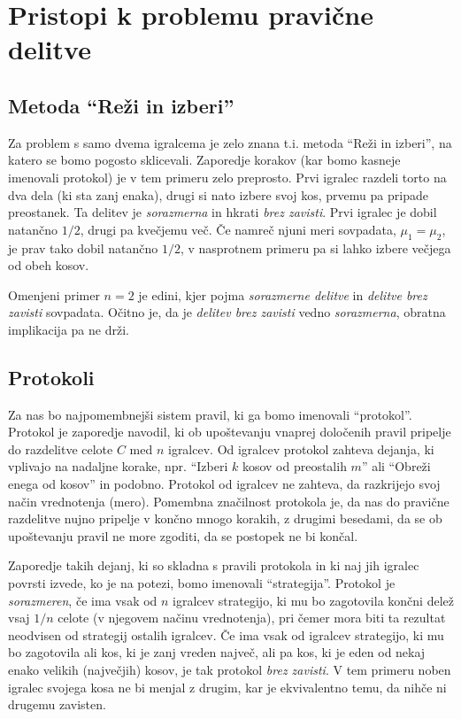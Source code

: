 \documentclass[a4paper,12pt]{article}
\begin{document}
\section{Pristopi k problemu pravične delitve}

\subsection{Metoda ``Reži in izberi''}

Za problem s samo dvema igralcema je zelo znana t.i. metoda ``Reži in izberi'', na katero se bomo pogosto sklicevali. Zaporedje korakov (kar bomo kasneje imenovali protokol) je v tem primeru zelo preprosto. Prvi igralec razdeli torto na dva dela (ki sta zanj enaka), drugi si nato izbere svoj kos, prvemu pa pripade preostanek. Ta delitev je {\em sorazmerna\/} in hkrati {\em brez zavisti\/}. Prvi igralec je dobil natančno $1/2$, drugi pa kvečjemu več. Če namreč njuni meri sovpadata, $\mu_1 = \mu_2$, je prav tako dobil natančno $1/2$, v nasprotnem primeru pa si lahko izbere večjega od obeh kosov.

Omenjeni primer $n = 2$ je edini, kjer pojma {\em sorazmerne delitve\/} in {\em delitve brez zavisti\/} sovpadata. Očitno je, da je {\em delitev brez zavisti\/} vedno {\em sorazmerna\/}, obratna implikacija pa ne drži.

\subsection{Protokoli}

Za nas bo najpomembnejši sistem pravil, ki ga bomo imenovali ``protokol''. Protokol je zaporedje navodil, ki ob upoštevanju vnaprej določenih pravil pripelje do razdelitve celote $C$ med $n$ igralcev. Od igralcev protokol zahteva dejanja, ki vplivajo na nadaljne korake, npr. ``Izberi $k$ kosov od preostalih $m$'' ali ``Obreži enega od kosov'' in podobno. Protokol od igralcev ne zahteva, da razkrijejo svoj način vrednotenja (mero). Pomembna značilnost protokola je, da nas do pravične razdelitve nujno pripelje v končno mnogo korakih, z drugimi besedami, da se ob upoštevanju pravil ne more zgoditi, da se postopek ne bi končal.

Zaporedje takih dejanj, ki so skladna s pravili protokola in ki naj jih igralec povrsti izvede, ko je na potezi, bomo imenovali ``strategija''. Protokol je {\em sorazmeren}, če ima vsak od $n$ igralcev strategijo, ki mu bo zagotovila končni delež vsaj $1/n$ celote (v njegovem načinu vrednotenja), pri čemer mora biti ta rezultat neodvisen od strategij ostalih igralcev. Če ima vsak od igralcev strategijo, ki mu bo zagotovila ali kos, ki je zanj vreden največ, ali pa kos, ki je eden od nekaj enako velikih (največjih) kosov, je tak protokol {\em brez zavisti}. V tem primeru noben igralec svojega kosa ne bi menjal z drugim, kar je ekvivalentno temu, da nihče ni drugemu zavisten.
\end{document}
